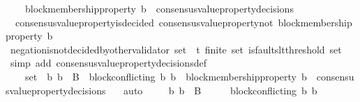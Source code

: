 \begin{isabellebody}
\ \ \ \ {\isachardoublequoteopen}block{\isacharunderscore}membership{\isacharunderscore}property\ b{}\ {\isasymin}\ consensus{\isacharunderscore}value{\isacharunderscore}property{\isacharunderscore}decisions\ {\isasymsigma}{\isacharprime}{\isachardoublequoteclose}\ \isanewline
\ \ \ \isamarkupfalse%
\ {\isachardoublequoteopen}{\isasymnot}\ consensus{\isacharunderscore}value{\isacharunderscore}property{\isacharunderscore}is{\isacharunderscore}decided\ {\isacharparenleft}consensus{\isacharunderscore}value{\isacharunderscore}property{\isacharunderscore}not\ {\isacharparenleft}block{\isacharunderscore}membership{\isacharunderscore}property\ b{}{\isacharparenright}{\isacharcomma}\ {\isasymsigma}{\isacharprime}{\isacharparenright}{\isachardoublequoteclose}\isanewline
\ \ \ \ \ \ \isamarkupfalse%
\ negation{\isacharunderscore}is{\isacharunderscore}not{\isacharunderscore}decided{\isacharunderscore}by{\isacharunderscore}other{\isacharunderscore}validator\ {\isacartoucheopen}{\isasymsigma}{\isacharunderscore}set\ {\isasymsubseteq}\ {\isasymSigma}t{\isacartoucheclose}\ {\isacartoucheopen}finite\ {\isasymsigma}{\isacharunderscore}set{\isacartoucheclose}\ {\isacartoucheopen}is{\isacharunderscore}faults{\isacharunderscore}lt{\isacharunderscore}threshold\ {\isacharparenleft}{\isasymUnion}{\isasymsigma}{\isacharunderscore}set{\isacharparenright}{\isacartoucheclose}\ \isamarkupfalse%
\ {\isacharparenleft}simp\ add{\isacharcolon}\ consensus{\isacharunderscore}value{\isacharunderscore}property{\isacharunderscore}decisions{\isacharunderscore}def{\isacharparenright}\ \isanewline
\ \ \ \ \ \ \isamarkupfalse%
\ {\isacartoucheopen}{\isacharbraceleft}{\isasymsigma}{\isacharcomma}\ {\isasymsigma}{\isacharprime}{\isacharbraceright}\ {\isasymsubseteq}\ {\isasymsigma}{\isacharunderscore}set\ {\isasymand}\ {\isacharbraceleft}b{}{\isacharcomma}\ b{}{\isacharbraceright}\ {\isasymsubseteq}\ B\ {\isasymand}\ block{\isacharunderscore}conflicting\ {\isacharparenleft}b{}{\isacharcomma}\ b{}{\isacharparenright}\ {\isasymand}\ block{\isacharunderscore}membership{\isacharunderscore}property\ b{}\ {\isasymin}\ consensus{\isacharunderscore}value{\isacharunderscore}property{\isacharunderscore}decisions\ {\isasymsigma}{\isacartoucheclose}\ \isamarkupfalse%
\ auto\isanewline
\ \ \ \isamarkupfalse%
\ {\isachardoublequoteopen}{\isacharbraceleft}b{}{\isacharcomma}\ b{}{\isacharbraceright}\ {\isasymsubseteq}\ B\ {\isasymand}\ {\isasymsigma}\ {\isasymin}\ {\isasymSigma}\ {\isasymand}\ block{\isacharunderscore}conflicting\ {\isacharparenleft}b{}{\isacharcomma}\ b{}{\isacharparenright}{\isachardoublequoteclose}\isanewline

\end{isabellebody}
